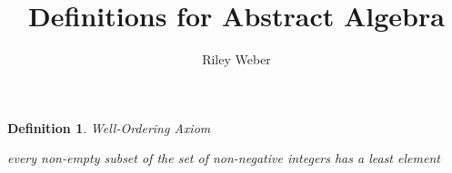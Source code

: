 \documentclass{article}
\newtheorem{definition}{Definition}
\begin{document}
\title{Definitions for Abstract Algebra}
\author{Riley Weber}
\maketitle

\begin{definition}
  Well-Ordering Axiom 
  
  every non-empty subset of the set of non-negative integers has a least element
\end{definition}
\end{document}

